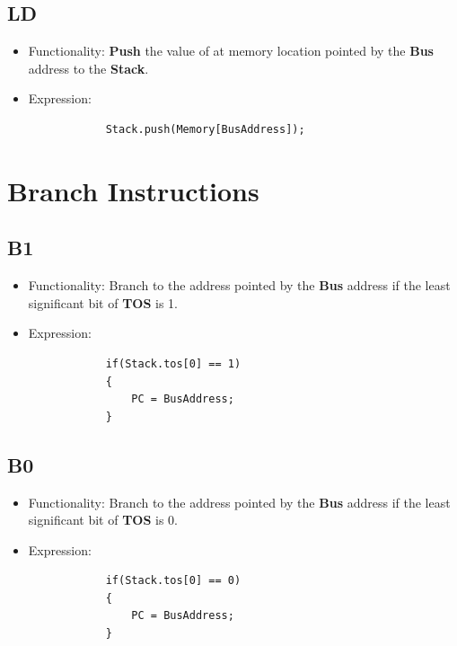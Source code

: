 \documentclass[11pt]{report}
\begin{document}
    \subsection{LD}
    \begin{itemize}
        \item Functionality: \textbf{Push} the value of at memory location 
                pointed by the \textbf{Bus} address to the \textbf{Stack}.
        \item Expression:
        \begin{verbatim}
            Stack.push(Memory[BusAddress]);
        \end{verbatim}
    \end{itemize}

    \section{Branch Instructions}
    \subsection{B1}
    \begin{itemize}
        \item Functionality: Branch to the address pointed by the \textbf{Bus} 
                address if the least significant bit of \textbf{TOS} is 1.
        \item Expression:
        \begin{verbatim}
            if(Stack.tos[0] == 1)
            {
                PC = BusAddress;
            }
        \end{verbatim}
    \end{itemize}

    \subsection{B0}
    \begin{itemize}
        \item Functionality: Branch to the address pointed by the \textbf{Bus} 
                address if the least significant bit of \textbf{TOS} is 0.
        \item Expression:
        \begin{verbatim}
            if(Stack.tos[0] == 0)
            {
                PC = BusAddress;
            }
        \end{verbatim}
    \end{itemize}
\end{document}
